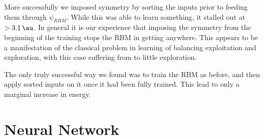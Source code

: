 \documentclass[Thesis.tex]{subfiles}
\begin{document}
More successfully we imposed symmetry by sorting the inputs prior to feeding
them through $\psi_{RBM}$. While this was able to learn something, it stalled
out at $>\SI{3.1}{\au}$. In general it is our experience that imposing the
symmetry from the beginning of the training stops the RBM in getting anywhere.
This appears to be a manifestation of the classical problem in learning of balancing
exploitation and exploration, with this case suffering from to little
exploration.

The only truly successful way we found was to train the RBM as before, and then
apply sorted inputs on it once it had been fully trained. This lead to only a
marginal increase in energy.

\section{Neural Network}
\end{document}
